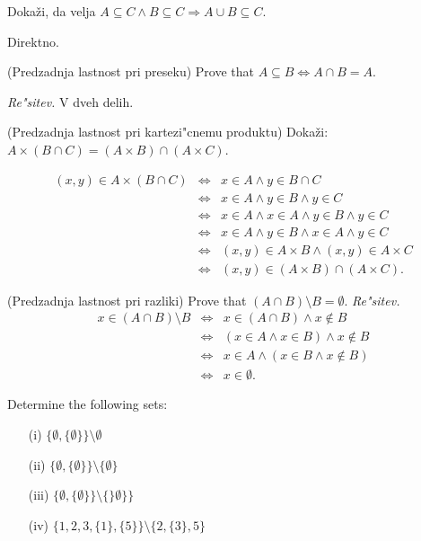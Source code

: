 \documentclass[11pt,paper=b5,footinclude,headinclude]{scrbook} %
\newtheorem{ex}{Vaja\hypertarget{sol:\theex}}[chapter]
\begin{document}
\begin{ex}
Dokaži, da velja $A\subseteq C  \wedge B\subseteq C \Rightarrow A\cup B\subseteq C$.

\begin{sol}
    Direktno.
\end{sol}

\end{ex}
\begin{ex}
 (Predzadnja lastnost pri preseku) Prove that $A\subseteq  B \Leftrightarrow A\cap B = A$.

\emph{ Re"sitev.} V dveh delih.

\end{ex}
\begin{ex}
 (Predzadnja lastnost pri kartezi"cnemu produktu) Dokaži: $A\times (B\cap C) = (A\times B)\cap (A\times C)$.

\begin{sol}
\begin{eqnarray*}
(x,y)\in A\times (B\cap C) &\Leftrightarrow & x \in A \wedge y\in B\cap C\\
&\Leftrightarrow & x \in A \wedge y\in B  \wedge y\in C\\
&\Leftrightarrow & x \in A \wedge x \in A\wedge y\in B  \wedge y\in C\\
&\Leftrightarrow & x \in A \wedge  y\in B  \wedge x \in A\wedge y\in C\\
&\Leftrightarrow & (x,y) \in A\times B \wedge  (x,y) \in A\times C\\
&\Leftrightarrow & (x,y) \in (A\times B)\cap   (A\times C).
\end{eqnarray*}
\end{sol}


\end{ex}
\begin{ex}
 (Predzadnja lastnost pri razliki) Prove that $(A\cap B )\setminus B = \emptyset$.
\emph{ Re"sitev.} 
\begin{eqnarray*}
x\in (A\cap B )\setminus B  &\Leftrightarrow & x \in (A\cap B)  \wedge x\notin B\\
&\Leftrightarrow & (x\in A\wedge x\in  B ) \wedge x\notin B\\
&\Leftrightarrow & x\in A\wedge (x\in  B  \wedge x\notin B)\\
&\Leftrightarrow & x\in \emptyset.
\end{eqnarray*}

\end{ex}
\begin{ex}
 Determine the following sets:
\begin{enumerate}
\item[(i)] $\{\emptyset, \{\emptyset\}\}\setminus \emptyset$ \quad [$\{\emptyset, \{\emptyset\}\}$]
\item[(ii)] $\{\emptyset, \{\emptyset\}\}\setminus \{\emptyset\}$
\item[(iii)] $\{\emptyset, \{\emptyset\}\}\setminus \{\}\emptyset\}\}$
\item[(iv)] $\{1,2,3,\{1\}, \{5\}  \}\setminus \{2,\{3\},5\}$
\end{enumerate}

\end{ex}
\end{document}
